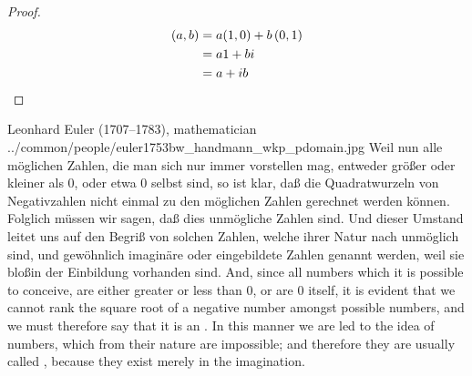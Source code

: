 \begin{proof}
\begin{align*}
  \left( a,b\right)
    &= a(1,0) + b\left( 0,1\right)
  \\&= a1 + bi
  \\&= a + ib
\end{align*}
\end{proof}



\qboxnpqt
  {
    Leonhard Euler (1707--1783), mathematician
    \footnotemark
  }
  {../common/people/euler1753bw_handmann_wkp_pdomain.jpg}
  {Weil nun alle m\"oglichen Zahlen, die man sich nur immer vorstellen mag,
    entweder gr\"o{\ss}er oder kleiner als 0, oder etwa 0 selbst sind, so ist klar, da{\ss}
    die Quadratwurzeln von Negativzahlen nicht einmal zu den m\"oglichen Zahlen
    gerechnet werden k\"onnen.
    Folglich m\"ussen wir sagen, da{\ss} dies unm\"ogliche Zahlen sind.
    Und dieser Umstand leitet uns auf den Begri{\ss} von solchen Zahlen,
    welche ihrer Natur nach unm\"oglich sind, und gew\"ohnlich imagin\"are
    oder eingebildete Zahlen genannt werden, weil sie blo\ss in der Einbildung
    vorhanden sind.}
  {And, since all numbers which it is possible to conceive,
    are either greater or less than 0, or are 0 itself,
    it is evident that we cannot rank the square root of a negative
    number amongst possible numbers, and we must therefore say that
    it is an .
    In this manner we are led to the idea of numbers,
    which from their nature are impossible;
    and therefore they are usually called ,
    because they exist merely in the imagination.}


